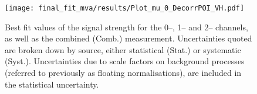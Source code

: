 \begin{figure}[hb]
	\centering
	\texttt{[image: final\_fit\_mva/results/Plot\_mu\_0\_DecorrPOI\_VH.pdf]}
  \caption{Best fit values of the signal strength for the 0--, 1-- and 2--
    channels, as well as the combined (Comb.) measurement. Uncertainties quoted
    are broken down by source, either statistical (Stat.) or systematic (Syst.).
    Uncertainties due to scale factors on background processes (referred to
    previously as floating normalisations), are included in the statistical
    uncertainty.}
  \label{fig:channels-mus}
\end{figure}